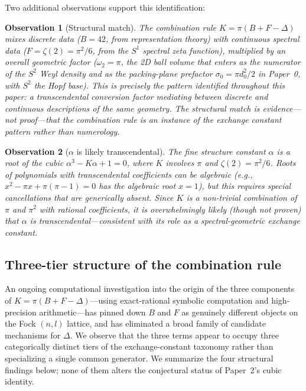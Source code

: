 \documentclass[aps,pra,twocolumn,superscriptaddress,longbibliography]{revtex4-2}
\newtheorem{observation}{Observation}
\begin{document}
Two additional observations support this identification:

\begin{observation}[Structural match]
The combination rule $K = \pi(B + F - \Delta)$ mixes discrete
data ($B = 42$, from representation theory) with continuous
spectral data ($F = \zeta(2) = \pi^2/6$, from the $S^1$
spectral zeta function), multiplied by an overall geometric
factor ($\omega_2 = \pi$, the 2D ball volume that enters as the
numerator of the $S^2$ Weyl density and as the packing-plane
prefactor $\sigma_0 = \pi d_0^2 / 2$ in Paper~0, with $S^2$ the
Hopf base).  This is precisely the pattern identified throughout this
paper: a transcendental conversion factor mediating between
discrete and continuous descriptions of the same geometry.
The structural match is evidence---not proof---that the
combination rule is an instance of the exchange constant pattern
rather than numerology.
\end{observation}

\begin{observation}[$\alpha$ is likely transcendental]
The fine structure constant $\alpha$ is a root of the cubic
$\alpha^3 - K\alpha + 1 = 0$, where $K$ involves $\pi$ and
$\zeta(2) = \pi^2/6$.  Roots of polynomials with transcendental
coefficients \textit{can} be algebraic (e.g., $x^2 - \pi x +
\pi(\pi - 1) = 0$ has the algebraic root $x = 1$), but this
requires special cancellations that are generically absent.
Since $K$ is a non-trivial combination of $\pi$ and $\pi^2$
with rational coefficients, it is overwhelmingly likely
(though not proven) that $\alpha$ is transcendental---consistent
with its role as a spectral-geometric exchange constant.
\end{observation}

\subsection{Three-tier structure of the combination rule}
\label{sec:alpha_three_tier}

An ongoing computational investigation into the origin of the three
components of $K = \pi(B + F - \Delta)$---using exact-rational
symbolic computation and high-precision arithmetic---has pinned down
$B$ and $F$ as genuinely different objects on the Fock $(n,l)$
lattice, and has eliminated a broad family of candidate mechanisms
for $\Delta$. We observe that the three terms appear to occupy
three categorically distinct tiers of the exchange-constant
taxonomy rather than specializing a single common generator. We
summarize the four structural findings below; none of them alters
the conjectural status of Paper~2's cubic identity.
\end{document}
